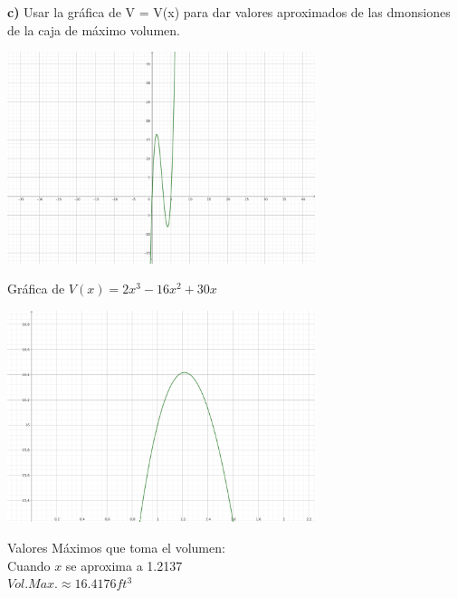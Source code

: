 \textbf{c)} Usar la gráfica de V = V(x) para dar valores aproximados de las dmonsiones de la caja de máximo volumen.
\begin{center}
     \includegraphics[width=9cm]{recursos/Grafic_caja.png}\par
     Gráfica de $V(x) = 2x^{3}-16x^{2}+30x $
\end{center}
\par
\begin{center}
     \includegraphics[width=9cm]{recursos/Problema_caja3.png}\par
     Valores Máximos que toma el volumen: \\
     Cuando $x$ se aproxima a 1.2137\\
     $Vol. Max. \approx 16.4176  ft^{3}$
\end{center}
